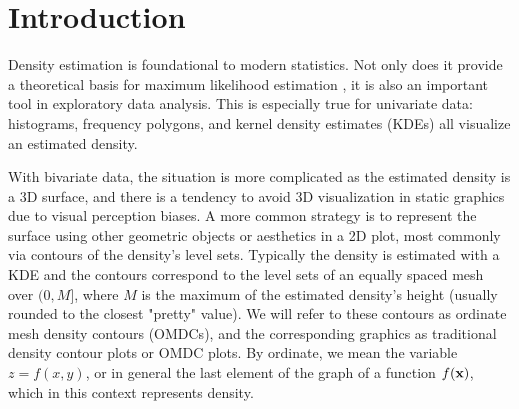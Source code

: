 \maketitle
{}




\section{Introduction}\label{sec:introduction}

Density estimation is foundational to modern statistics.
Not only does it provide a theoretical basis for maximum likelihood estimation \citep{scott_multivariate_1992},
it is also an important tool in exploratory data analysis.
This is especially true for univariate data: histograms, frequency polygons, and kernel density estimates (KDEs) all visualize an estimated density.

With bivariate data, the situation is more complicated as the estimated density is a 3D surface, and there is a tendency to avoid 3D visualization in static graphics due to visual perception biases.
A more common strategy is to represent the surface using other geometric objects or aesthetics in a 2D plot, most commonly via contours of the density's level sets.
Typically the density is estimated with a KDE and the contours correspond to the level sets of an equally spaced mesh over $(0,M]$, where $M$ is the maximum of the estimated density's height (usually rounded to the closest "pretty" value).
We will refer to these contours as ordinate mesh density contours (OMDCs), and the corresponding graphics as traditional density contour plots or OMDC plots.
By ordinate, we mean the variable $z = f(x,y)$, or in general the last element of the graph of a function $f(\textbf{x})$, which in this context represents density.

